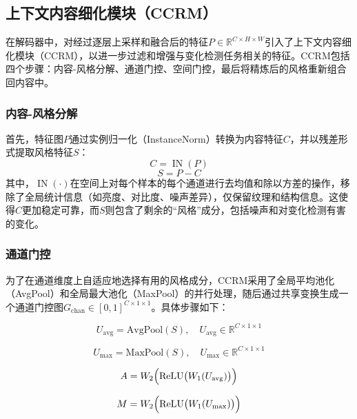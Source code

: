 \subsection{上下文内容细化模块（CCRM）}
在解码器中，对经过逐层上采样和融合后的特征$P\in\mathbb{R}^{C\times H\times W}$引入了上下文内容细化模块（CCRM），以进一步过滤和增强与变化检测任务相关的特征。CCRM包括四个步骤：内容-风格分解、通道门控、空间门控，最后将精炼后的风格重新组合回内容中。

\subsubsection{内容-风格分解}
首先，特征图$P$通过实例归一化（InstanceNorm）转换为内容特征$C$，并以残差形式提取风格特征$S$：
\begin{equation}\label{eq:ccr_in}
C = \operatorname{IN}(P)
\end{equation}
\begin{equation}\label{eq:ccr_residual}
S = P - C
\end{equation}
其中，\(\operatorname{IN}(\cdot)\)在空间上对每个样本的每个通道进行去均值和除以方差的操作，移除了全局统计信息（如亮度、对比度、噪声差异），仅保留纹理和结构信息。这使得\(C\)更加稳定可靠，而\(S\)则包含了剩余的“风格”成分，包括噪声和对变化检测有害的变化。

\subsubsection{通道门控}
为了在通道维度上自适应地选择有用的风格成分，CCRM采用了全局平均池化（AvgPool）和全局最大池化（MaxPool）的并行处理，随后通过共享变换生成一个通道门控图\(G_{\mathrm{chan}}\in[0,1]^{C\times1\times1}\)。具体步骤如下：

\begin{equation}\label{eq:ccr_avg_pool}
U_{\mathrm{avg}} = \mathrm{AvgPool}(S), \quad U_{\mathrm{avg}} \in \mathbb{R}^{C\times1\times1}
\end{equation}

\begin{equation}\label{eq:ccr_max_pool}
U_{\mathrm{max}} = \mathrm{MaxPool}(S), \quad U_{\mathrm{max}} \in \mathbb{R}^{C\times1\times1}
\end{equation}

\begin{equation}\label{eq:ccr_fc_avg}
A = W_2\Bigl(\mathrm{ReLU}\bigl(W_1(U_{\mathrm{avg}})\bigr)\Bigr)
\end{equation}

\begin{equation}\label{eq:ccr_fc_max}
M = W_2\Bigl(\mathrm{ReLU}\bigl(W_1(U_{\mathrm{max}})\bigr)\Bigr)
\end{equation}

